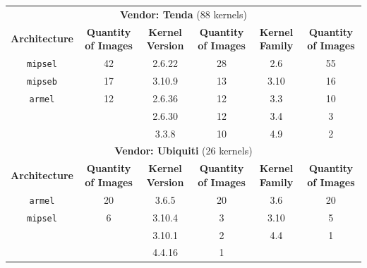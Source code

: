 \begin{table}[h]
{\begin{tabular}{cccccc}
\multicolumn{6}{c}{\textbf{Vendor: Tenda} (88 kernels)}                                                                    \\
\textbf{Architecture} & \multicolumn{1}{c|}{\textbf{Quantity of Images}} & \textbf{Kernel Version} & \multicolumn{1}{c|}{\textbf{Quantity of Images}} & \textbf{Kernel Family} & \textbf{Quantity of Images} \\ \hline
{\tt mipsel}            & \multicolumn{1}{c|}{42}                & 2.6.22                 & \multicolumn{1}{c|}{28}                           & 2.6                     & 55                         \\
{\tt mipseb}            & \multicolumn{1}{c|}{17}                & 3.10.9                  & \multicolumn{1}{c|}{13}                          & 3.10                    & 16                         \\
{\tt armel}             & \multicolumn{1}{c|}{12}                & 2.6.36                  & \multicolumn{1}{c|}{12}                          & 3.3                     & 10                         \\
                        & \multicolumn{1}{c|}{}                  & 2.6.30                  & \multicolumn{1}{c|}{12}                          & 3.4                     & 3                          \\
                        & \multicolumn{1}{c|}{}                  & 3.3.8                   & \multicolumn{1}{c|}{10}                          & 4.9                     & 2                          \\ \hline

\multicolumn{6}{c}{\textbf{Vendor: Ubiquiti} (26 kernels)}                                                                    \\
\textbf{Architecture} & \multicolumn{1}{c|}{\textbf{Quantity of Images}} & \textbf{Kernel Version} & \multicolumn{1}{c|}{\textbf{Quantity of Images}} & \textbf{Kernel Family} & \textbf{Quantity of Images} \\ \hline
{\tt armel}             & \multicolumn{1}{c|}{20}                & 3.6.5                  & \multicolumn{1}{c|}{20}                           & 3.6                     & 20                         \\
{\tt mipsel}            & \multicolumn{1}{c|}{6}                 & 3.10.4                  & \multicolumn{1}{c|}{3}                           & 3.10                    & 5                          \\
                        & \multicolumn{1}{c|}{}                  & 3.10.1                  & \multicolumn{1}{c|}{2}                           & 4.4                     & 1                          \\
                        & \multicolumn{1}{c|}{}                  & 4.4.16                  & \multicolumn{1}{c|}{1}                           &                         &                            \\ \hline


\end{tabular}}
\end{table}
